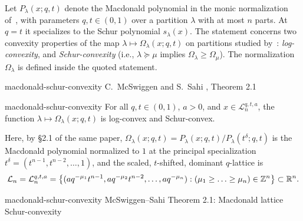 

\begin{cxcredits}
\end{cxcredits}

\begin{cxcontext}
Let $P_\lambda(x;q,t)$ denote the Macdonald polynomial in the monic normalization of~\citet{macdonald1998symmetric}, with parameters $q,t\in(0,1)$ over a partition $\lambda$ with at most $n$ parts. At $q=t$ it specializes to the Schur polynomial $s_\lambda(x)$.  The statement concerns two convexity properties of the map $\lambda\mapsto\Omega_\lambda(x;q,t)$ on partitions studied by~\citet{McSwiggenSahi2026}: \emph{log-convexity}, and \emph{Schur-convexity} (i.e., $\lambda\succeq\mu$ implies $\Omega_\lambda\ge\Omega_\mu$).  The normalization $\Omega_\lambda$ is defined inside the quoted statement.
\end{cxcontext}


\begin{cxsource}{macdonald-schur-convexity}
C.~McSwiggen and S.~Sahi \citeyearpar{McSwiggenSahi2026}, Theorem 2.1
\end{cxsource}

\begin{cxstatement}{macdonald-schur-convexity}
For all $q,t\in(0,1)$, $a>0$, and $x\in\mathcal L_n^{q,t,a}$, the function $\lambda\mapsto\Omega_\lambda(x;q,t)$ is log-convex and Schur-convex.

Here, by \S2.1 of the same paper, $\Omega_\lambda(x;q,t)=P_\lambda(x;q,t)/P_\lambda(t^\delta;q,t)$ is the Macdonald polynomial normalized to $1$ at the principal specialization $t^\delta=(t^{n-1},t^{n-2},\ldots,1)$, and the scaled, $t$-shifted, dominant $q$-lattice is
\[\mathcal L_n=\mathcal L_n^{q,t,a}=\left\{(aq^{-\mu_1}t^{n-1},aq^{-\mu_2}t^{n-2},\ldots,aq^{-\mu_n}):(\mu_1\ge\ldots\ge\mu_n)\in\mathbb Z^n\right\}\subset\mathbb R^n.\]
\end{cxstatement}

\begin{cxsummary}{macdonald-schur-convexity}
McSwiggen--Sahi Theorem 2.1: Macdonald lattice Schur-convexity \citeyearpar{McSwiggenSahi2026}
\end{cxsummary}

